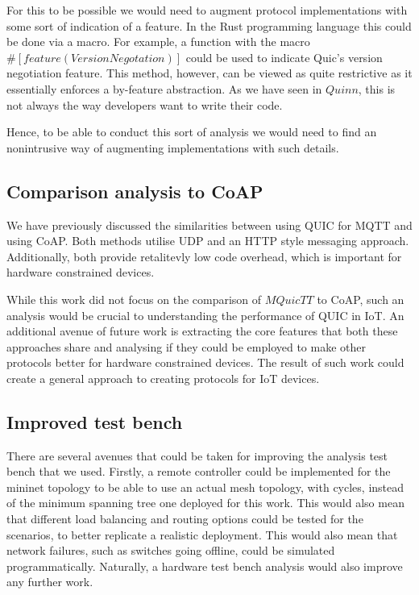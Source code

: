 For this to be possible we would need to augment protocol implementations with some sort of indication of a feature.
In the Rust programming language this could be done via a macro.
For example, a function with the macro $\#[feature(VersionNegotation)]$ could be used to indicate Quic's version negotiation feature.
This method, however, can be viewed as quite restrictive as it essentially enforces a by-feature abstraction.
As we have seen in $Quinn$, this is not always the way developers want to write their code.

Hence, to be able to conduct this sort of analysis we would need to find an nonintrusive way of augmenting implementations with such details.

\subsection{Comparison analysis to CoAP}

We have previously discussed the similarities between using QUIC for MQTT and using CoAP.
Both methods utilise UDP and an HTTP style messaging approach.
Additionally, both provide retalitevly low code overhead, which is important for hardware constrained devices.

While this work did not focus on the comparison of $MQuicTT$ to CoAP, such an analysis would be crucial to understanding the performance of QUIC in IoT.
An additional avenue of future work is extracting the core features that both these approaches share and analysing if they could be employed to make other protocols better for hardware constrained devices.
The result of such work could create a general approach to creating protocols for IoT devices.

\subsection{Improved test bench}

There are several avenues that could be taken for improving the analysis test bench that we used.
Firstly, a remote controller could be implemented for the mininet topology to be able to use an actual mesh topology, with cycles, instead of the minimum spanning tree one deployed for this work.
This would also mean that different load balancing and routing options could be tested for the scenarios, to better replicate a realistic deployment.
This would also mean that network failures, such as switches going offline, could be simulated programmatically.
Naturally, a hardware test bench analysis would also improve any further work.